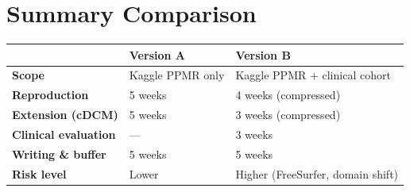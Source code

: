 \documentclass[a4paper,11pt]{article}
\begin{document}
\section*{Summary Comparison}

\begin{table}[h!]
\centering
\begin{tabularx}{\textwidth}{@{}lXX@{}}
\toprule
 & \textbf{Version A} & \textbf{Version B} \\
\midrule
\textbf{Scope} & Kaggle PPMR only & Kaggle PPMR + clinical cohort \\
\textbf{Reproduction} & 5 weeks & 4 weeks (compressed) \\
\textbf{Extension (cDCM)} & 5 weeks & 3 weeks (compressed) \\
\textbf{Clinical evaluation} & --- & 3 weeks \\
\textbf{Writing \& buffer} & 5 weeks & 5 weeks \\
\textbf{Risk level} & Lower & Higher (FreeSurfer, domain shift) \\
\bottomrule
\end{tabularx}
\end{table}
\end{document}

